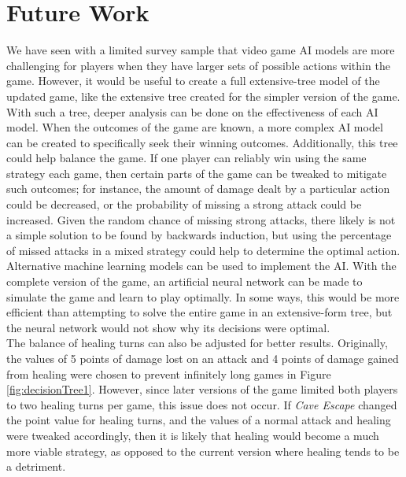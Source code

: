 \chapter{Future Work}
We have seen with a limited survey sample that video game AI models are more challenging for players when they have larger sets of possible actions within the game. However, it would be useful to create a full extensive-tree model of the updated game, like the extensive tree created for the simpler version of the game. With such a tree, deeper analysis can be done on the effectiveness of each AI model. When the outcomes of the game are known, a more complex AI model can be created to specifically seek their winning outcomes. Additionally, this tree could help balance the game. If one player can reliably win using the same strategy each game, then certain parts of the game can be tweaked to mitigate such outcomes; for instance, the amount of damage dealt by a particular action could be decreased, or the probability of missing a strong attack could be increased. Given the random chance of missing strong attacks, there likely is not a simple solution to be found by backwards induction, but using the percentage of missed attacks in a mixed strategy could help to determine the optimal action.\\

Alternative machine learning models can be used to implement the AI. With the complete version of the game, an artificial neural network can be made to simulate the game and learn to play optimally. In some ways, this would be more efficient than attempting to solve the entire game in an extensive-form tree, but the neural network would not show why its decisions were optimal.\\

The balance of healing turns can also be adjusted for better results. Originally, the values of 5 points of damage lost on an attack and 4 points of damage gained from healing were chosen to prevent infinitely long games in Figure \ref{fig:decisionTree1}. However, since later versions of the game limited both players to two healing turns per game, this issue does not occur. If \textit{Cave Escape} changed the point value for healing turns, and the values of a normal attack and healing were tweaked accordingly, then it is likely that healing would become a much more viable strategy, as opposed to the current version where healing tends to be a detriment.
